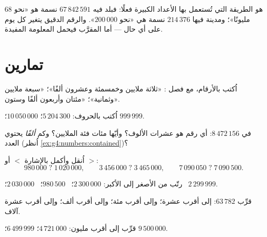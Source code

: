 \begin{example}\label{ex:g4:numbers:world}
 هو الطريقة التي تُستعمل بها الأعداد الكبيرة فعلًا: فبلد
فيه $67\,842\,591$ نسمة هو «نحو $68$ مليونًا»؛ ومدينة فيها
$214\,376$ نسمة هي «نحو $200\,000$». والرقم الدقيق يتغير كل
يوم على أي حال --- أما المقرَّب فيحمل المعلومة
المفيدة.
\end{example}

\section{تمارين}

\begin{exercise}[$\star$]\label{exo:g4:numbers:1}
اُكتب بالأرقام، مع فصل : «ثلاثة ملايين وخمسمئة
وعشرون ألفًا»؛ «سبعة ملايين وثمانية»؛ «مئتان وأربعون
ألفًا وستون».
\end{exercise}

\begin{exercise}[$\star$]\label{exo:g4:numbers:2}
اُكتب بالحروف: $5\,204\,300$؛ \quad $10\,050\,000$؛ \quad
$999\,999$.
\end{exercise}

\begin{exercise}[$\star$]\label{exo:g4:numbers:3}
في $8\,472\,156$: أي رقم هو عشرات الألوف؟ وأيّها مئات
فئة الملايين؟ وكم \emph{ألفًا} يحتوي العدد (اُنظر
\cref{ex:g4:numbers:contained})؟
\end{exercise}

\begin{exercise}[$\star$]\label{exo:g4:numbers:4}
اُنقل وأكمل بالإشارة $<$ أو $>$:
\[
980\,000 \;?\; 1\,020\,000, \qquad
3\,456\,000 \;?\; 3\,465\,000, \qquad
7\,090\,050 \;?\; 7\,090\,500 .
\]
\end{exercise}

\begin{exercise}[$\star$]\label{exo:g4:numbers:5}
رتّب من الأصغر إلى الأكبر: $2\,300\,000$؛ \ $980\,500$؛ \
$2\,030\,000$؛ \ $2\,299\,999$.
\end{exercise}

\begin{exercise}[$\star$]\label{exo:g4:numbers:6}
قرِّب $63\,782$: إلى أقرب عشرة؛ وإلى أقرب مئة؛ وإلى أقرب
ألف؛ وإلى أقرب عشرة آلاف.
\end{exercise}

\begin{exercise}[$\star$]\label{exo:g4:numbers:7}
قرِّب إلى أقرب مليون: $4\,721\,000$؛ \quad $6\,499\,999$؛
\quad $9\,500\,000$.
\end{exercise}

